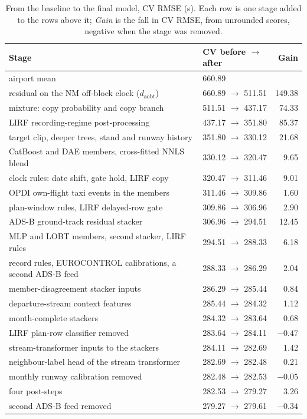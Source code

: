 \documentclass[
  manuscript=article,
  layout=preprint,
  year=2026,
  volume=x,
]{extra/joas}
\begin{document}
\begin{table}[htbp!]
  \centering
  \small
  \caption{From the baseline to the final model, CV RMSE (s). Each row is one stage added to the rows above it; \emph{Gain} is the fall in CV RMSE, from unrounded scores, negative when the stage was removed.}
  \label{tb:progress}
  \begin{tabular}{L{0.56\textwidth}lr}
  \toprule
  \textbf{Stage} & \textbf{CV before $\to$ after} & \textbf{Gain} \\
  \midrule
  airport mean & 660.89 & \\
  residual on the NM off-block clock ($d_{\mathrm{aobt}}$) & 660.89 $\to$ 511.51 & 149.38 \\
  mixture: copy probability and copy branch & 511.51 $\to$ 437.17 & 74.33 \\
  LIRF recording-regime post-processing & 437.17 $\to$ 351.80 & 85.37 \\
  target clip, deeper trees, stand and runway history & 351.80 $\to$ 330.12 & 21.68 \\
  CatBoost and DAE members, cross-fitted NNLS blend & 330.12 $\to$ 320.47 & 9.65 \\
  clock rules: date shift, gate hold, LIRF copy & 320.47 $\to$ 311.46 & 9.01 \\
  OPDI own-flight taxi events in the members & 311.46 $\to$ 309.86 & 1.60 \\
  plan-window rules, LIRF delayed-row gate & 309.86 $\to$ 306.96 & 2.90 \\
  ADS-B ground-track residual stacker & 306.96 $\to$ 294.51 & 12.45 \\
  MLP and LOBT members, second stacker, LIRF rules & 294.51 $\to$ 288.33 & 6.18 \\
  record rules, EUROCONTROL calibrations, a second ADS-B feed & 288.33 $\to$ 286.29 & 2.04 \\
  member-disagreement stacker inputs & 286.29 $\to$ 285.44 & 0.84 \\
  departure-stream context features & 285.44 $\to$ 284.32 & 1.12 \\
  month-complete stackers & 284.32 $\to$ 283.64 & 0.68 \\
  LIRF plan-row classifier removed & 283.64 $\to$ 284.11 & $-0.47$ \\
  stream-transformer inputs to the stackers & 284.11 $\to$ 282.69 & 1.42 \\
  neighbour-label head of the stream transformer & 282.69 $\to$ 282.48 & 0.21 \\
  monthly runway calibration removed & 282.48 $\to$ 282.53 & $-0.05$ \\
  four post-steps & 282.53 $\to$ 279.27 & 3.26 \\
  second ADS-B feed removed & 279.27 $\to$ 279.61 & $-0.34$ \\
  \bottomrule
  \end{tabular}
\end{table}
\end{document}

